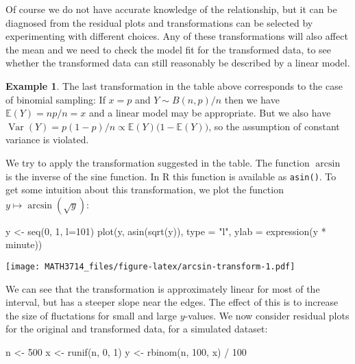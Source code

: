 \documentclass[
  a4paper,
]{article}
\newenvironment{Shaded}{\begin{snugshade}}{\end{snugshade}}
\newcommand{\AttributeTok}[1]{\textcolor[rgb]{0.77,0.63,0.00}{#1}}
\newcommand{\DecValTok}[1]{\textcolor[rgb]{0.00,0.00,0.81}{#1}}
\newcommand{\FunctionTok}[1]{\textcolor[rgb]{0.00,0.00,0.00}{#1}}
\newcommand{\NormalTok}[1]{#1}
\newcommand{\OtherTok}[1]{\textcolor[rgb]{0.56,0.35,0.01}{#1}}
\newcommand{\SpecialCharTok}[1]{\textcolor[rgb]{0.00,0.00,0.00}{#1}}
\newcommand{\StringTok}[1]{\textcolor[rgb]{0.31,0.60,0.02}{#1}}
\theoremstyle{definition}
\theoremstyle{definition}
\newtheorem{example}{Example}[section]
\theoremstyle{definition}
\theoremstyle{definition}
\theoremstyle{remark}
\begin{document}
Of course we do not have accurate knowledge of the relationship, but it can be
diagnosed from the residual plots and transformations can be selected by
experimenting with different choices. Any of these transformations will also
affect the mean and we need to check the model fit for the transformed data, to
see whether the transformed data can still reasonably be described by a linear
model.

\begin{example}
The last transformation in the table above corresponds to the case of binomial
sampling: If \(x = p\) and \(Y \sim B(n, p) / n\) then we have \(\mathbb{E}(Y) = n p / n = x\) and a linear model may be appropriate. But we also have \(\mathop{\mathrm{Var}}(Y) = p (1 - p) / n \propto \mathbb{E}(Y) \bigl( 1- \mathbb{E}(Y) \bigr)\), so the assumption of
constant variance is violated.

We try to apply the transformation suggested in the table. The
function \(\arcsin\) is the inverse of the sine function. In R
this function is available as \texttt{asin()}. To get some intuition about
this transformation, we plot the function \(y \mapsto \arcsin(\sqrt{y})\):

\begin{Shaded}
\begin{Highlighting}[]
\NormalTok{y }\OtherTok{\textless{}{-}} \FunctionTok{seq}\NormalTok{(}\DecValTok{0}\NormalTok{, }\DecValTok{1}\NormalTok{, }\AttributeTok{l=}\DecValTok{101}\NormalTok{)}
\FunctionTok{plot}\NormalTok{(y, }\FunctionTok{asin}\NormalTok{(}\FunctionTok{sqrt}\NormalTok{(y)), }\AttributeTok{type =} \StringTok{"l"}\NormalTok{,}
     \AttributeTok{ylab =} \FunctionTok{expression}\NormalTok{(y }\SpecialCharTok{*}\NormalTok{ minute))}
\end{Highlighting}
\end{Shaded}

\texttt{[image: MATH3714\_files/figure-latex/arcsin-transform-1.pdf]}

We can see that the transformation is approximately linear for most
of the interval, but has a steeper slope near the edges. The effect of
this is to increase the size of fluctations for small and large
\(y\)-values. We now consider residual plots for the original and transformed
data, for a simulated dataset:

\begin{Shaded}
\begin{Highlighting}[]
\NormalTok{n }\OtherTok{\textless{}{-}} \DecValTok{500}
\NormalTok{x }\OtherTok{\textless{}{-}} \FunctionTok{runif}\NormalTok{(n, }\DecValTok{0}\NormalTok{, }\DecValTok{1}\NormalTok{)}
\NormalTok{y }\OtherTok{\textless{}{-}} \FunctionTok{rbinom}\NormalTok{(n, }\DecValTok{100}\NormalTok{, x) }\SpecialCharTok{/} \DecValTok{100}


\end{Highlighting}
\end{Shaded}
\end{example}
\end{document}

